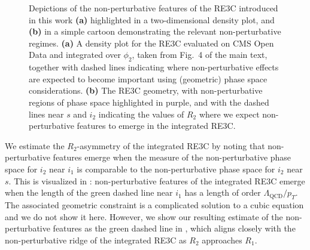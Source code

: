 \begin{figure}[t]
    \centering
    \caption[Non-perturbative features of the resolved three-point energy correlator.]{
        Depictions of the non-perturbative features of the RE3C introduced in this work \textbf{(a)} highlighted in a two-dimensional density plot, and \textbf{(b)} in a simple cartoon demonstrating the relevant non-perturbative regimes.
        \textbf{(a)}
        A density plot for the RE3C evaluated on CMS Open Data and integrated over \(\phi_2\), taken from Fig.~4 of the main text, together with dashed lines indicating where non-perturbative effects are expected to become important using (geometric) phase space considerations.
        \textbf{(b)}
        The RE3C geometry, with non-perturbative regions of phase space highlighted in purple, and with the dashed lines near \(s\) and \(i_2\) indicating the values of \(R_2\) where we expect non-perturbative features to emerge in the integrated RE3C.
    }
	\label{fig:nonpert}
\end{figure}

We estimate the \(R_2\)-asymmetry of the integrated RE3C by noting that non-perturbative features emerge when the measure of the non-perturbative phase space for \(i_2\) near \(i_1\) is comparable to the non-perturbative phase space for \(i_2\) near \(s\).
%
This is visualized in :
%
non-perturbative features of the integrated RE3C emerge when the length of the green dashed line near \(i_1\) has a length of order \(\Lambda_\text{QCD}/p_T\).
%
The associated geometric constraint is a complicated solution to a cubic equation and we do not show it here.
%
However, we show our resulting estimate of the non-perturbative features as the green dashed line in , which aligns closely with the non-perturbative ridge of the integrated RE3C as \(R_2\) approaches \(R_1\).




